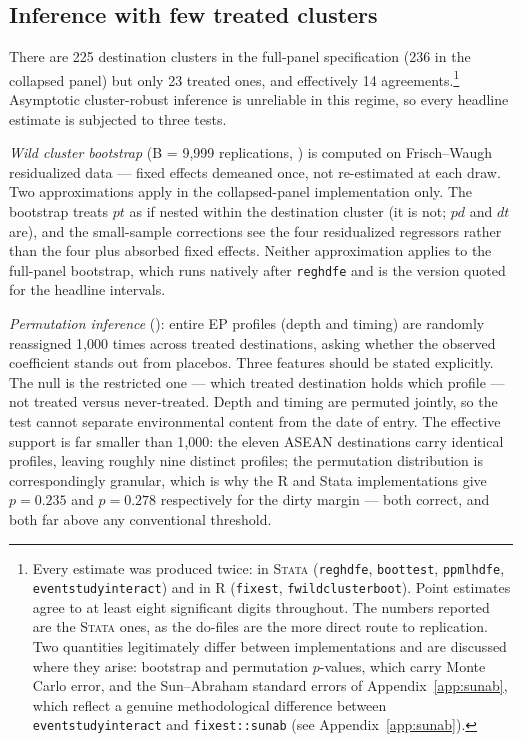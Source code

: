 \documentclass[12pt]{article}
\begin{document}
\subsection{Inference with few treated clusters}\label{sec:inference}

There are 225 destination clusters in the full-panel specification (236 in the collapsed
panel) but only 23 treated ones, and effectively 14 agreements.\footnote{Every estimate
was produced twice: in \textsc{Stata} (\texttt{reghdfe}, \texttt{boottest},
\texttt{ppmlhdfe}, \texttt{eventstudyinteract}) and in \textsc{R} (\texttt{fixest},
\texttt{fwildclusterboot}). Point estimates agree to at least eight significant digits
throughout. The numbers reported are the \textsc{Stata} ones, as the do-files are the
more direct route to replication. Two quantities legitimately differ between
implementations and are discussed where they arise: bootstrap and permutation $p$-values,
which carry Monte Carlo error, and the Sun--Abraham standard errors of
Appendix~\ref{app:sunab}, which reflect a genuine methodological difference between
\texttt{eventstudyinteract} and \texttt{fixest::sunab} (see Appendix~\ref{app:sunab}).}
Asymptotic cluster-robust inference is unreliable in this regime, so every headline
estimate is subjected to three tests.

\emph{Wild cluster bootstrap} (B = 9{,}999 replications, \citealp{cameron2008,
roodman2019}) is computed on Frisch--Waugh residualized data --- fixed effects demeaned
once, not re-estimated at each draw. Two approximations apply in the collapsed-panel
implementation only. The bootstrap treats $pt$ as if nested within the destination
cluster (it is not; $pd$ and $dt$ are), and the small-sample corrections see the four
residualized regressors rather than the four plus absorbed fixed effects. Neither
approximation applies to the full-panel bootstrap, which runs natively after
\texttt{reghdfe} and is the version quoted for the headline intervals.

\emph{Permutation inference} (\citealp{fisher1935}): entire EP profiles (depth and
timing) are randomly reassigned 1{,}000 times across treated destinations, asking whether
the observed coefficient stands out from placebos. Three features should be stated
explicitly. The null is the restricted one --- which treated destination holds which
profile --- not treated versus never-treated. Depth and timing are permuted jointly, so
the test cannot separate environmental content from the date of entry. The effective
support is far smaller than 1{,}000: the eleven ASEAN destinations carry identical
profiles, leaving roughly nine distinct profiles; the permutation distribution is
correspondingly granular, which is why the R and Stata implementations give $p = 0.235$
and $p = 0.278$ respectively for the dirty margin --- both correct, and both far above
any conventional threshold.
\end{document}
